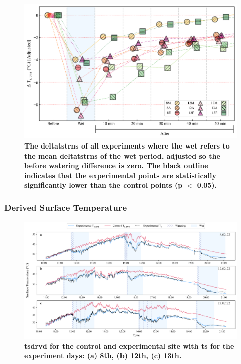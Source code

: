 \documentclass[final,3p,times,authoryear]{elsarticle}
\begin{document}
\begin{figure}
\centering
\includegraphics[trim={0 0 0 0},clip,scale=1.0]{pict045.png}
\caption{\bf The \gls{deltatstrns} of all experiments where the wet refers to the mean \gls{deltatstrns} of the wet period, adjusted so the before watering difference is zero. The black outline indicates that the experimental points are statistically significantly lower than the control points (\gls{p} $<$ 0.05).}
 \label{fig:7.16}
\end{figure}
\clearpage


\subsubsection{Derived Surface Temperature}\label{sec:appendix7.5.10}

\begin{figure}
\centering
\includegraphics[trim={0 0 0 0},clip,scale=1.0]{pict028.png}
\caption{\bf \gls{tsdrvd} for the control and experimental site with \gls{ts} for the experiment days: (a) 8th, (b) 12th, (c) 13th.}
 \label{fig:7.17}
\end{figure}
\end{document}
